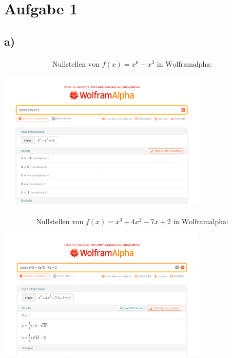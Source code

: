 \section{Aufgabe 1}
    \subsection{a)}
        \subsubsection{}
            $$\text{Nullstellen von }f(x) = x^6 - x^2 \text{ in Wolframalpha: }$$
            \begin{center}
                \includegraphics[width = 0.75\textwidth]{Aufgaben/01/1a)i).png}    
            \end{center}

        \subsubsection{}
            $$\text{Nullstellen von }f(x) = x^3 + 4x^2 - 7x + 2 \text{ in Wolframalpha: }$$
            \begin{center}
                \includegraphics[width = 0.75\textwidth]{Aufgaben/01/1a)ii).png}    
            \end{center}
